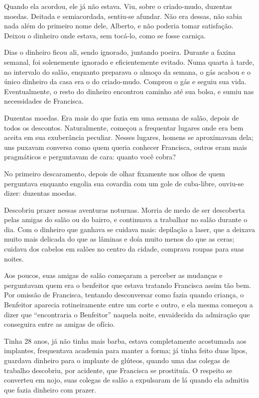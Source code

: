 \documentclass[11pt,a4paper,twoside,openany]{book}
\begin{document}
Quando ela acordou, ele já não estava. Viu, sobre o criado-mudo, duzentas moedas. Deitada e semiacordada, sentiu-se afundar. Não era dessas, não sabia nada além do primeiro nome dele, Alberto, e não poderia tomar satisfação. Deixou o dinheiro onde estava, sem tocá-lo, como se fosse carniça.

Dias o dinheiro ficou ali, sendo ignorado, juntando poeira. Durante a faxina semanal, foi solenemente ignorado e eficientemente evitado. Numa quarta à tarde, no intervalo do salão, enquanto preparava o almoço da semana, o gás acabou e o único dinheiro da casa era o do criado-mudo. Comprou o gás e seguiu sua vida. Eventualmente, o resto do dinheiro encontrou caminho até sua bolsa, e sumiu nas necessidades de Francisca.

Duzentas moedas. Era mais do que fazia em uma semana de salão, depois de todos os descontos. Naturalmente, começou a frequentar lugares onde era bem aceita em sua exuberância peculiar. Nesses lugares, homens se aproximavam dela; uns puxavam conversa como quem queria conhecer Francisca, outros eram mais pragmáticos e perguntavam de cara: quanto você cobra?

No primeiro descaramento, depois de olhar fixamente nos olhos de quem perguntava enquanto engolia sua covardia com um gole de cuba-libre, ouviu-se dizer: duzentas moedas.

Descobriu prazer nessas aventuras noturnas. Morria de medo de ser descoberta pelas amigas do salão ou do bairro, e continuava a trabalhar no salão durante o dia. Com o dinheiro que ganhava se cuidava mais: depilação a laser, que a deixava muito mais delicada do que as lâminas e doía muito menos do que as ceras; cuidava dos cabelos em salões no centro da cidade, comprava roupas para suas noites.

Aos poucos, suas amigas de salão começaram a perceber as mudanças e perguntavam quem era o benfeitor que estava tratando Francisca assim tão bem. Por omissão de Francisca, tentando desconversar como fazia quando criança, o Benfeitor aparecia rotineiramente entre um corte e outro, e ela mesma começou a dizer que “encontraria o Benfeitor” naquela noite, envaidecida da admiração que conseguira entre as amigas de ofício.

Tinha 28 anos, já não tinha mais barba, estava completamente acostumada aos implantes, frequentava academia para manter a forma; já tinha feito duas lipos, guardava dinheiro para o implante de glúteos, quando uma das colegas de trabalho descobriu, por acidente, que Francisca se prostituía. O respeito se converteu em nojo, suas colegas de salão a expulsaram de lá quando ela admitiu que fazia dinheiro com prazer. 
\end{document}
